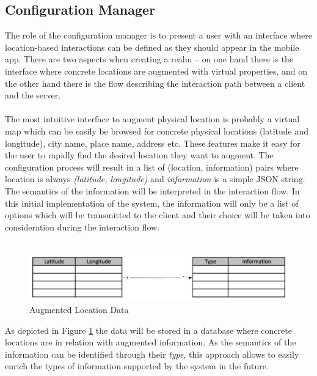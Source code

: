 \subsection{Configuration Manager} %
\label{sub:configuration_manager}
The role of the configuration manager is to present a user with an interface where location-based interactions can be defined as they should appear in the mobile app. There are two aspects when creating a realm -- on one hand there is the interface where concrete locations are augmented with virtual properties, and on the other hand there is the flow describing the interaction path between a client and the server.
\\\\
The most intuitive interface to augment physical location is probably a virtual map which can be easily be browsed for concrete physical locations (latitude and longitude), city name, place name, address etc. These features make it easy for the user to rapidly find the desired location they want to augment. The configuration process will result in a list of (location, information) pairs where location is always \emph{(latitude, longitude)} and \emph{information} is a simple JSON string. The semantics of the information will be interpreted in the interaction flow. In this initial implementation of the system, the information will only be a list of options which will be transmitted to the client and their choice will be taken into consideration during the interaction flow.
\\\\
\begin{figure}[H]
	\centering
	\includegraphics[width=0.9\linewidth]{fig/virtual_properties}
	\caption{Augmented Location Data}
	\label{fig.design.virtual_properties}
\end{figure}
As depicted in Figure \ref{fig.design.virtual_properties} the data will be stored in a database where concrete locations are in relation with augmented information. As the semantics of the information can be identified through their \emph{type}, this approach allows to easily enrich the types of information supported by the system in the future.
\\\\
